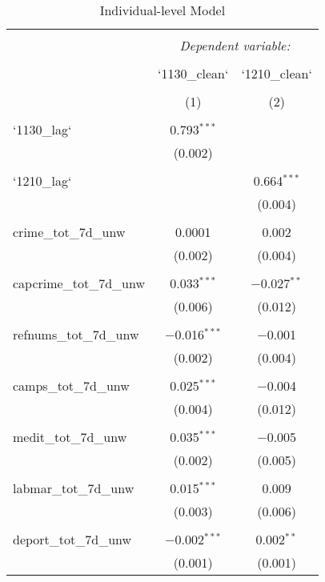 
\begin{table}[!htbp] \centering 
  \caption{Individual-level Model} 
  \label{} 
\begin{tabular}{@{\extracolsep{5pt}}lcc} 
\\[-1.8ex]\hline 
\hline \\[-1.8ex] 
 & \multicolumn{2}{c}{\textit{Dependent variable:}} \\ 
\cline{2-3} 
\\[-1.8ex] & `1130\_clean` & `1210\_clean` \\ 
\\[-1.8ex] & (1) & (2)\\ 
\hline \\[-1.8ex] 
 `1130\_lag` & 0.793$^{***}$ &  \\ 
  & (0.002) &  \\ 
  & & \\ 
 `1210\_lag` &  & 0.664$^{***}$ \\ 
  &  & (0.004) \\ 
  & & \\ 
 crime\_tot\_7d\_unw & 0.0001 & 0.002 \\ 
  & (0.002) & (0.004) \\ 
  & & \\ 
 capcrime\_tot\_7d\_unw & 0.033$^{***}$ & $-$0.027$^{**}$ \\ 
  & (0.006) & (0.012) \\ 
  & & \\ 
 refnums\_tot\_7d\_unw & $-$0.016$^{***}$ & $-$0.001 \\ 
  & (0.002) & (0.004) \\ 
  & & \\ 
 camps\_tot\_7d\_unw & 0.025$^{***}$ & $-$0.004 \\ 
  & (0.004) & (0.012) \\ 
  & & \\ 
 medit\_tot\_7d\_unw & 0.035$^{***}$ & $-$0.005 \\ 
  & (0.002) & (0.005) \\ 
  & & \\ 
 labmar\_tot\_7d\_unw & 0.015$^{***}$ & 0.009 \\ 
  & (0.003) & (0.006) \\ 
  & & \\ 
 deport\_tot\_7d\_unw & $-$0.002$^{***}$ & 0.002$^{**}$ \\ 
  & (0.001) & (0.001) \\ 

\end{tabular}
\end{table}
